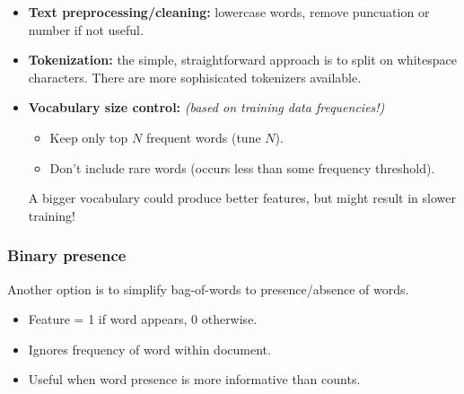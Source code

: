 \documentclass[11pt]{article}
\begin{document}
\begin{note}
\begin{itemize}
    \item \textbf{Text preprocessing/cleaning:} lowercase words, remove puncuation or number if not useful.
    \item \textbf{Tokenization:} the simple, straightforward approach is to split on whitespace characters. There are more sophisicated tokenizers available.
    \item \textbf{Vocabulary size control:} \textit{(based on training data frequencies!)}
    \begin{itemize}
        \item Keep only top $N$ frequent words (tune $N$).
        \item Don't include rare words (occurs less than some frequency threshold).
    \end{itemize}
    \begin{warning}[Tradeoff]
        A bigger vocabulary could produce better features, but might result in slower training!
    \end{warning}
\end{itemize}
\end{note}

\subsubsection{Binary presence}
Another option is to simplify bag-of-words to presence/absence of words.
\begin{itemize}
    \item Feature = 1 if word appears, 0 otherwise.
    \item Ignores frequency of word within document.
    \item Useful when word presence is more informative than counts.
\end{itemize}
\end{document}

